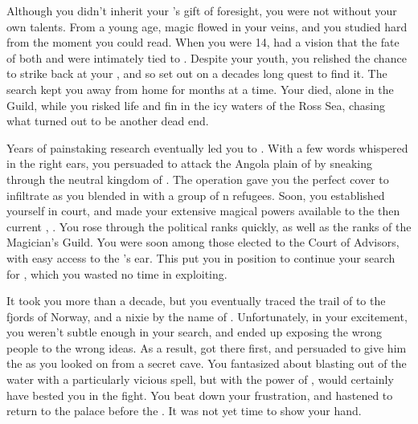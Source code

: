 \documentclass[char]{NeptuneBall}
\begin{document}
Although you didn't inherit your \cMother{\parent}'s gift of foresight, you were not without your own talents. From a young age, magic flowed in your veins, and you studied hard from the moment you could read. When you were 14, \cMother{} had a vision that the fate of both \pPacifica{} and \pAtlantis{} were intimately tied to \iTrident{\MYname}. Despite your youth, you relished the chance to strike back at your \cExExKing{\parent}, and so set out on a decades long quest to find it. The search kept you away from home for months at a time. Your \cMother{\parent} died, alone in the Guild, while you risked life and fin in the icy waters of the Ross Sea, chasing what turned out to be another dead end. 

Years of painstaking research eventually led you to \pAtlantis{}. With a few words whispered in the right ears, you persuaded \pPacifica{} to attack the Angola plain of \pAtlantis{} by sneaking through the neutral kingdom of \pIndia{}. The operation gave you the perfect cover to infiltrate \pAtlantis{} as you blended in with a group of \pAtlantis{}n refugees. Soon, you established yourself in court, and made your extensive magical powers available to the then current \cExKing{\King}, \cExKing{}. You rose through the political ranks quickly, as well as the ranks of the Magician's Guild. You were soon among those elected to the Court of Advisors, with easy access to the \cExKing{\King}'s ear. This put you in position to continue your search for \iTrident{\MYname}, which you wasted no time in exploiting.

It took you more than a decade, but you eventually traced the trail of \iTrident{\MYname} to the fjords of Norway, and a nixie by the name of \cNixie{}. Unfortunately, in your excitement, you weren't subtle enough in your search, and ended up exposing the wrong people to the wrong ideas. As a result, \cExKing{} got there first, and persuaded \cNixie{} to give him the \iTrident{\MYname} as you looked on from a secret cave. You fantasized about blasting \cExKing{\them} out of the water with a particularly vicious spell, but with the power of \iTrident{\MYname}, \cExKing{\they} would certainly have bested you in the fight. You beat down your frustration, and hastened to return to the palace before the \cExKing{\King}. It was not yet time to show your hand.
\end{document}
